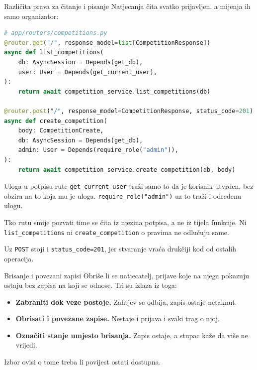 \begin{frame}[fragile]{Različita prava za čitanje i pisanje}
Natjecanja čita svatko prijavljen, a mijenja ih samo organizator:

\begin{lstlisting}[language=python]
# app/routers/competitions.py
@router.get("/", response_model=list[CompetitionResponse])
async def list_competitions(
    db: AsyncSession = Depends(get_db),
    user: User = Depends(get_current_user),
):
    return await competition_service.list_competitions(db)

@router.post("/", response_model=CompetitionResponse, status_code=201)
async def create_competition(
    body: CompetitionCreate,
    db: AsyncSession = Depends(get_db),
    admin: User = Depends(require_role("admin")),
):
    return await competition_service.create_competition(db, body)
\end{lstlisting}
\end{frame}

\begin{frame}{Uloga u potpisu rute}
\texttt{get\_current\_user} traži samo to da je korisnik utvrđen, bez obzira na to koja mu je uloga. \texttt{require\_role("admin")} uz to traži i određenu ulogu.

\vspace{1.1em}
Tko rutu smije pozvati time se čita iz njezina potpisa, a ne iz tijela funkcije. Ni \texttt{list\_competitions} ni \texttt{create\_competition} o pravima ne odlučuju same.

\vspace{1.1em}
Uz \texttt{POST} stoji i \texttt{status\_code=201}, jer stvaranje vraća drukčiji kod od ostalih operacija.
\end{frame}

\begin{frame}{Brisanje i povezani zapisi}
Obriše li se natjecatelj, prijave koje na njega pokazuju ostaju bez zapisa na koji se odnose. Tri su izlaza iz toga:

\vspace{1.1em}
\begin{itemize}
  \itemsep0.7em
  \item \textbf{Zabraniti dok veze postoje.} Zahtjev se odbija, zapis ostaje netaknut.
  \item \textbf{Obrisati i povezane zapise.} Nestaje i prijava i svaki trag o njoj.
  \item \textbf{Označiti stanje umjesto brisanja.} Zapis ostaje, a stupac kaže da više ne vrijedi.
\end{itemize}

\vspace{1.1em}
Izbor ovisi o tome treba li povijest ostati dostupna.
\end{frame}

